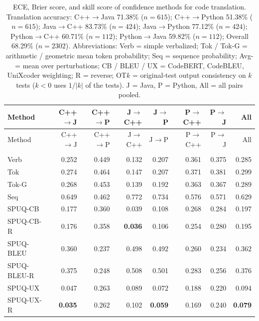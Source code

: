 {\scriptsize
\setlength{\tabcolsep}{2.5pt}
\renewcommand{\arraystretch}{0.95}
\begin{longtable}{@{}lrrrrrrr@{}}
\caption{ECE, Brier score, and skill score of confidence methods for code translation. Translation accuracy: C++$\rightarrow$Java 71.38\% ($n=615$); C++$\rightarrow$Python 51.38\% ($n=615$); Java$\rightarrow$C++ 83.73\% ($n=424$); Java$\rightarrow$Python 77.12\% ($n=424$); Python$\rightarrow$C++ 60.71\% ($n=112$); Python$\rightarrow$Java 59.82\% ($n=112$); Overall 68.29\% ($n=2302$). Abbreviations: Verb = simple verbalized; Tok / Tok-G = arithmetic / geometric mean token probability; Seq = sequence probability; Avg- = mean over perturbations; CB / BLEU / UX = CodeBERT, CodeBLEU, UniXcoder weighting; R = reverse; OT$k$ = original-test output consistency on $k$ tests ($k<0$ uses $1/|k|$ of the tests). J = Java, P = Python, All = all pairs pooled.\label{tab:translation-calibration}}\\
\toprule
Method & C++$\to$J & C++$\to$P & J$\to$C++ & J$\to$P & P$\to$C++ & P$\to$J & All \\
\midrule
\endfirsthead
\toprule
Method & C++$\to$J & C++$\to$P & J$\to$C++ & J$\to$P & P$\to$C++ & P$\to$J & All \\
\midrule
\endhead
\bottomrule
\endfoot
\multicolumn{8}{l}{\textit{ECE (10 bins, lower is better)}} \\
\midrule
Verb & 0.252 & 0.449 & 0.132 & 0.207 & 0.361 & 0.375 & 0.285 \\
\addlinespace
Tok & 0.274 & 0.464 & 0.147 & 0.207 & 0.371 & 0.381 & 0.299 \\
Tok-G & 0.268 & 0.453 & 0.139 & 0.192 & 0.363 & 0.367 & 0.289 \\
\addlinespace
Seq & 0.649 & 0.462 & 0.772 & 0.734 & 0.576 & 0.571 & 0.629 \\
\addlinespace
SPUQ-CB & 0.177 & 0.360 & 0.039 & 0.108 & 0.268 & 0.284 & 0.197 \\
SPUQ-CB-R & 0.176 & 0.358 & \textbf{0.036} & 0.106 & 0.254 & 0.280 & 0.195 \\
SPUQ-BLEU & 0.360 & 0.237 & 0.498 & 0.492 & 0.260 & 0.234 & 0.362 \\
SPUQ-BLEU-R & 0.375 & 0.248 & 0.508 & 0.501 & 0.283 & 0.256 & 0.376 \\
SPUQ-UX & 0.047 & 0.263 & 0.089 & 0.072 & 0.188 & 0.220 & 0.094 \\
SPUQ-UX-R & \textbf{0.035} & 0.262 & 0.102 & \textbf{0.059} & 0.169 & 0.240 & \textbf{0.079} \\

\end{longtable}}
